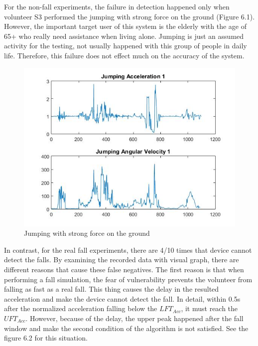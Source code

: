 \documentclass[letterpaper,12pt,titlepage,oneside,final]{book}
\begin{document}
For the non-fall experiments, the failure in detection happened only when volunteer S3 performed the jumping with strong force on the ground (Figure 6.1). However, the important target user of this system is the elderly with the age of 65+ who really need assistance when living alone. Jumping is just an assumed activity for the testing, not usually happened with this group of people in daily life. Therefore, this failure does not effect much on the accuracy of the system.
\clearpage
\begin{figure}[h!]
	\centering
	\includegraphics[scale=0.5]{jump_strong}
	\caption{Jumping with strong force on the ground}
\end{figure}
In contrast, for the real fall experiments, there are 4/10 times that device cannot detect the falls. By examining the recorded data with visual graph, there are different reasons that cause these false negatives. The first reason is that when performing a fall simulation, the fear of vulnerability prevents the volunteer from falling as fast as a real fall. This thing causes the delay in the resulted acceleration and make the device cannot detect the fall. In detail, within 0.5s after the normalized acceleration falling below the $LFT_{Acc}$, it must reach the $UFT_{Acc}$. However, because of the delay, the upper peak happened after the fall window and make the second condition of the algorithm is not satisfied. See the figure 6.2 for this situation. 
\end{document}

